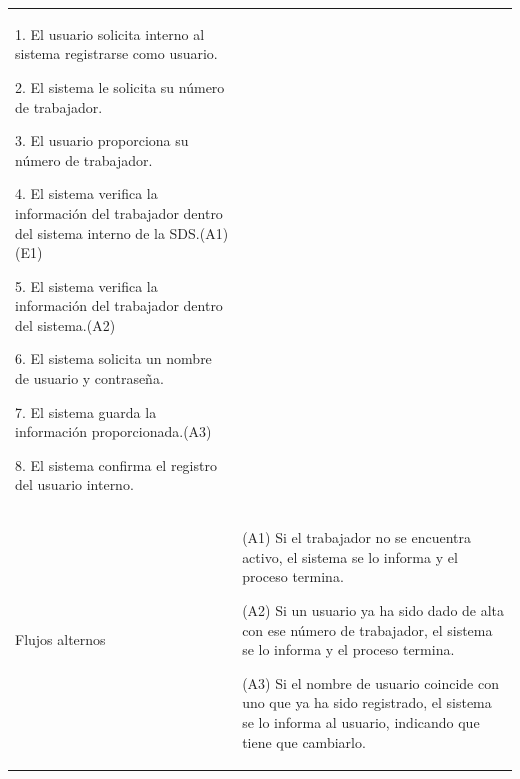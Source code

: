 \begin{longtable}{@{\extracolsep{8pt}}l p{8.5cm}}
 1. El usuario solicita interno al sistema registrarse como usuario. \par\vspace{.1cm}

 2. El sistema le solicita su número de trabajador. \par\vspace{.1cm}

 3. El usuario proporciona su número de trabajador. \par\vspace{.1cm}

 4. El sistema verifica la información del trabajador dentro del sistema interno de la SDS.(A1)(E1) \par\vspace{.1cm}

 5. El sistema verifica la información del trabajador dentro del sistema.(A2) \par\vspace{.1cm}

 6. El sistema solicita un nombre de usuario y contraseña. \par\vspace{.1cm}

 7. El sistema guarda la información proporcionada.(A3) \par\vspace{.1cm}

 8. El sistema confirma el registro del usuario interno. \par\vspace{.1cm}

   \par\vspace{.1cm}

\\

\hspace{.2cm}Flujos alternos & 
\par (A1) Si el trabajador no se encuentra activo, el sistema se lo informa y el proceso termina.

\par (A2) Si un usuario ya ha sido dado de alta con ese número de trabajador, el sistema se lo informa y el proceso termina.

\par (A3) Si el nombre de usuario coincide con uno que ya ha sido registrado, el sistema se lo informa al usuario, indicando que tiene que cambiarlo. 



\\


\end{longtable}

